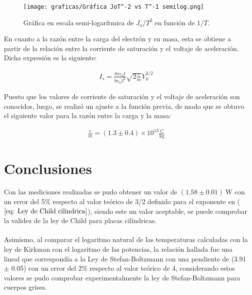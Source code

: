 \documentclass[%
 reprint,
 amsmath,amssymb,
 aps,
]{revtex4-2}
\begin{document}
\begin{figure}[H]
    \centering
    \texttt{[image: graficas/Gráfica JoT^-2 vs T^-1 semilog.png]}
    \caption{Gráfica en escala semi-logarítmica de $J_{o}/T^{2}$ en función de $1/T$.}
    \label{fig: Grafica Ley de Richardson}
\end{figure}

\vspace{0.2 cm}
En cuanto a la razón entre la carga del electrón y su masa, esta se obtiene a partir de la relación entre la corriente de saturación y el voltaje de aceleración. Dicha expresión es la siguiente:

\begin{align}
    I_{s} = \frac{8\pi \varepsilon_{0}l}{9r_{a}\beta^{2}}\sqrt{2\frac{e}{m}}V_{0}^{3/2}
    \label{11}
\end{align}

\vspace{0.2 cm}
Puesto que los valores de corriente de saturación y el voltaje de aceleración son conocidos, luego, se realizó un ajuste a la función previa, de modo que se obtuvo el siguiente valor para la razón entre la carga y la masa:

\begin{align*}
    \frac{e}{m} = (1.3 \pm 0.4)\times 10^{13} \frac{\text{C}}{\text{kg}}
\end{align*}



\section{Conclusiones}

Con las mediciones realizadas se pudo obtener un valor de $(1.58\pm 0.01)\ \text{W}$ con un error del 5$\%$ respecto al valor teórico de 3/2 definido para el exponente en ($\ref{eq: Ley de Child cilindrica}$), siendo este un valor aceptable, se puede comprobar la validez de la  ley de Child para placas cilíndricas.
\\\\
Asimismo, al comparar el logaritmo natural de las temperaturas calculadas con la ley de Kirkman con el logaritmo de las potencias, la relación hallada fue una lineal que correspondía a la Ley de Stefan-Boltzmann con una pendiente de (3.91 $\pm$ 0.05) con un error del $2\%$ respecto al valor teórico de 4, considerando estos valores se pudo comprobar experimentalmente la ley de Stefan-Boltzmann para cuerpos grises.
\\
\end{document}

